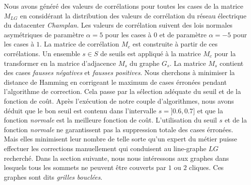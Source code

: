 Nous avons g\'en\'er\'e des valeurs de corr\'elations pour toutes les cases de la matrice $M_{LG}$ en consid\'erant la distribution des valeurs de corr\'elation du r\'eseau \'electrique du datacenter {\em Champlan}. 
Les valeurs de corr\'elation suivent des lois normales asym\'etriques de param\`etre $\alpha = 5$ pour les cases \`a $0$ et  de param\`etre $\alpha = -5$ pour les cases \`a $1$.
La matrice de corr\'elation $M_c$ est construite \`a partir de ces corr\'elations.
Un ensemble $s \in S$ de seuils est appliqu\'e \`a la matrice $M_c$ pour la transformer en la matrice d'adjacence $M_s$ du graphe $G_s$. 
La matrice $M_s$ contient des cases {\em fausses n\'egatives} et {\em fausses positives}. 
Nous cherchons \`a minimiser la distance de Hamming en corrigeant le maximum de cases \'erron\'ees pendant l'algorithme de correction. Cela passe par la s\'election ad\'equate du seuil et de la fonction de co\^ut.
Apr\`es l'ex\'ecution de notre couple d'algorithmes, nous  avons d\'eduit que le bon seuil est contenu dans l'intervalle $s = ]0.6,0.7]$ et que la fonction {\em normale} est la meilleure fonction de co\^ut. 
L'utilisation du seuil $s$ et de la fonction {\em normale} ne garantissent pas la suppression totale des cases \'erron\'ees.  Mais elles minimisent leur nombre de telle sorte qu'un expert du m\'etier puisse effectuer les corrections manuellement qui conduisent au line-graphe $LG$ recherch\'e.
Dans la section suivante, nous nous int\'eressons aux graphes dans lesquels tous les sommets ne peuvent \^etre couverts par $1$ ou $2$ cliques. Ces graphes sont dits {\em grilles boucl\'ees}. 